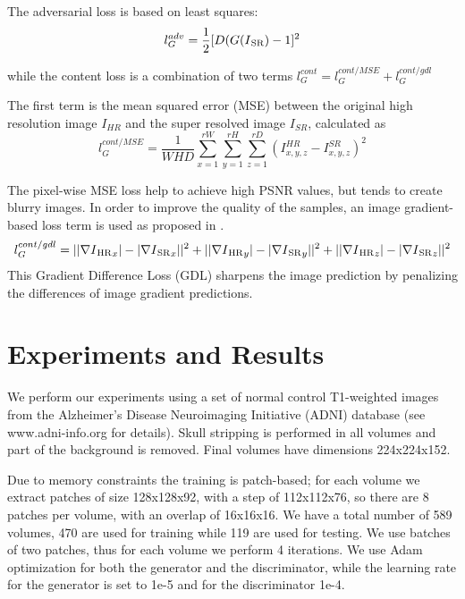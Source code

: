 \documentclass{article}
\begin{document}
The adversarial loss is based on least squares:
\begin{equation}\label{eq:cost_Adv}
	l_{G}^{adv} = \frac{1}{2}[D(G(I\textsubscript{SR})-1]^{2}
\end{equation}

while the content loss is a combination of two terms $l_{G}^{cont}= l_G^{cont/MSE} + l_G^{cont/gdl}$

The first term is the mean squared error (MSE) between the original high resolution image $I_{HR}$ and the super resolved image $I_{SR}$, calculated as
\begin{equation}\label{eq:loss_MSE}
	l_{G}^{cont/MSE} = \frac{1}{WHD} \sum_{x=1}^{rW} \sum_{y=1}^{rH}\sum_{z=1}^{rD}(I_{x,y,z}^{HR}-I_{x,y,z}^{SR})^2
\end{equation}

The pixel-wise MSE loss help to achieve high PSNR values, but tends to create blurry images. In order to improve the quality of the samples, an image gradient-based loss term is used as proposed in \cite{couprie:video}.
\begin{equation}\label{eq:loss_gdl}
l_{G}^{cont/gdl} = ||\nabla I\textsubscript{HR}_{x}| - |\nabla I\textsubscript{SR}_{x}||^2 + ||\nabla I\textsubscript{HR}_{y}| - |\nabla I\textsubscript{SR}_{y}||^2 + ||\nabla I\textsubscript{HR}_{z}| - |\nabla I\textsubscript{SR}_{z}||^2
\end{equation}
This Gradient Difference Loss (GDL) sharpens the image prediction by penalizing the differences of image gradient predictions.








\section{Experiments and Results}
\label{sec:expresults}

We perform our experiments using a set of normal control T1-weighted images from the Alzheimer’s Disease Neuroimaging Initiative (ADNI) database (see www.adni-info.org for details). Skull stripping is performed in all volumes and part of the background is removed. Final volumes have dimensions 224x224x152.

Due to memory constraints the training is patch-based; for each volume we extract patches of size 128x128x92, with a step of 112x112x76, so there are 8 patches per volume, with an overlap of 16x16x16. We have a total number of 589 volumes, 470 are used for training while 119 are used for testing. We use batches of two patches, thus for each volume we perform 4 iterations. We use Adam optimization for both the generator and the discriminator, while the learning rate for the generator is set to 1e-5 and for the discriminator 1e-4.
\end{document}
